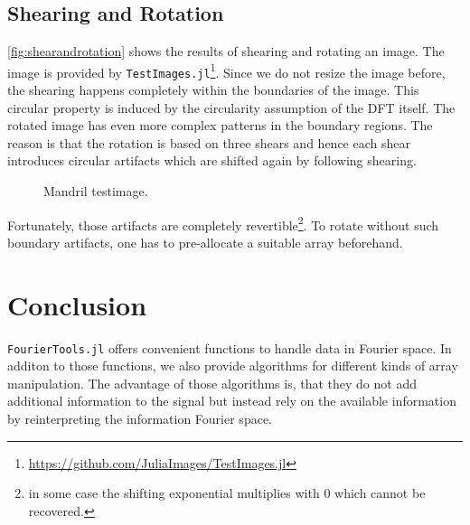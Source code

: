 \documentclass{juliacon}
\begin{document}
    \subsection{Shearing and Rotation}
        \autoref{fig:shearandrotation} shows the results of shearing and rotating an image.
        The image is provided by \verb|TestImages.jl|\footnote{\url{https://github.com/JuliaImages/TestImages.jl}}.
        Since we do not resize the image before, the shearing happens completely within the boundaries of the image.
        This circular property is induced by the circularity assumption of the DFT itself.
        The rotated image has even more complex patterns in the boundary regions.
        The reason is that the rotation is based on three shears and hence 
        each shear introduces circular artifacts which are shifted again by following shearing.
        \begin{figure}[h]
            \caption{Mandril testimage.}
            \label{fig:shearandrotation}
        \end{figure}
        Fortunately, those artifacts are completely revertible\footnote{in some case the shifting exponential multiplies with $0$ which cannot be recovered.}.
        To rotate without such boundary artifacts, one has to pre-allocate a suitable array beforehand.
        
\section{Conclusion}
    \verb|FourierTools.jl| offers convenient functions to handle data in Fourier space.
    In additon to those functions, we also provide algorithms for different kinds of array manipulation.
    The advantage of those algorithms is, that they do not add additional information 
    to the signal but instead rely on the available information
    by reinterpreting the information Fourier space.
\end{document}
